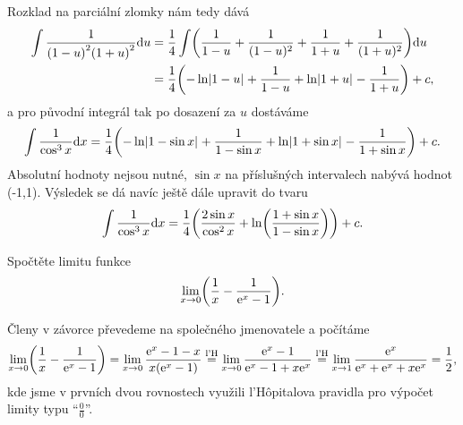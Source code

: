 \documentclass[answers]{exam}
\begin{document}
\begin{questions}
\begin{solution}
    Rozklad na parciální zlomky nám tedy dává
    \begin{align*}
      \int \frac{1}{\parens{1-u}^2 \parens{1+u}^2} \diff u
      &=
      \frac{1}{4}
      \int
        \left(
          \frac{1}{1 - u} + \frac{1}{(1 - u)^2} + \frac{1}{1 + u} + \frac{1}{(1 + u)^2}
        \right)
      \diff u
      \\
      &=
      \frac{1}{4}
      \parens{
        - \ln \abs{1 - u} + \frac{1}{1 - u} + \ln \abs{1 + u} - \frac{1}{1 + u}
      }
      +
      c,
    \end{align*}
    a pro původní integrál tak po dosazení za $u$ dostáváme
    \begin{equation*}
      \int \frac{1}{\cos^3 x} \diff x
      =
      \frac{1}{4}
      \parens{
        - \ln \abs{1 - \sin x} + \frac{1}{1 - \sin x} + \ln \abs{1 + \sin x} - \frac{1}{1 + \sin x}
      }
      +
      c.
    \end{equation*}
    Absolutní hodnoty nejsou nutné, $\sin x$ na příslušných intervalech nabývá hodnot (-1,1). Výsledek se dá navíc ještě dále upravit do tvaru
    \begin{equation*}
      \int \frac{1}{\cos^3 x} \diff x
      =
      \frac{1}{4}
      \parens{
        \frac{2 \sin x}{\cos^2 x} + \ln \parens{\frac{1 + \sin x}{1 - \sin x}}
      }
      +
      c.
    \end{equation*}    
  \end{solution}
  
  \question[2] Spočtěte limitu funkce
  \begin{equation*}
    \lim_{x \to 0} \parens{\frac{1}{x} - \frac{1}{\exponential{x} - 1}}.
  \end{equation*}
  
  \begin{solution}
  Členy v závorce převedeme na společného jmenovatele a počítáme
  \begin{equation*}
    \lim_{x \to 0} \parens{\frac{1}{x} - \frac{1}{\exponential{x} - 1}}
    =
    \lim_{x \to 0} \frac{\exponential{x} - 1 - x}{x \parens{\exponential{x} - 1}}
    \texteq{l'H}
    \lim_{x \to 0} \frac{\exponential{x} - 1}{\exponential{x} - 1 + x \exponential{x}}
    \texteq{l'H}
    \lim_{x \to 1} \frac{\exponential{x}}{\exponential{x} + \exponential{x} + x\exponential{x}}
    =
    \frac{1}{2},
  \end{equation*}
  kde jsme v prvních dvou rovnostech využili l'Hôpitalova pravidla pro výpočet limity typu ``$\frac{0}{0}$''.
  

\end{solution}
\end{questions}
\end{document}
